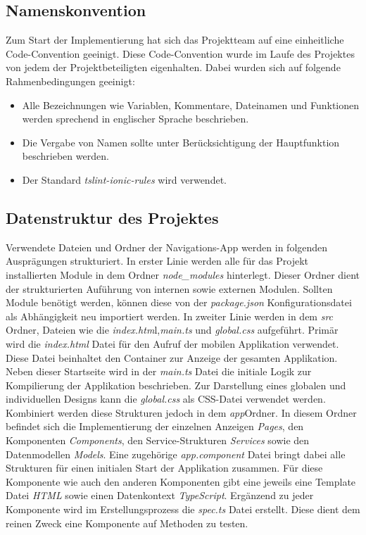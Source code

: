 \subsection{Namenskonvention}
Zum Start der Implementierung hat sich das Projektteam auf eine einheitliche Code-Convention geeinigt. 
Diese Code-Convention wurde im Laufe des Projektes von jedem der Projektbeteiligten eigenhalten. 
Dabei wurden sich auf folgende Rahmenbedingungen geeinigt: 
\begin{itemize}
	\item Alle Bezeichnungen wie Variablen, Kommentare, Dateinamen und Funktionen werden sprechend in englischer Sprache beschrieben.
	\item Die Vergabe von Namen sollte unter Berücksichtigung der Hauptfunktion beschrieben werden.
	\item Der Standard \textit{tslint-ionic-rules} wird verwendet.
\end{itemize}

\subsection{Datenstruktur des Projektes}
Verwendete Dateien und Ordner der Navigations-App werden in folgenden Ausprägungen strukturiert. 
In erster Linie werden alle für das Projekt installierten Module in dem Ordner \textit{node\_modules} hinterlegt. 
Dieser Ordner dient der strukturierten Auführung von internen sowie externen Modulen. 
Sollten Module benötigt werden, können diese von der \textit{package.json} Konfigurationsdatei als Abhängigkeit neu importiert werden. 
In zweiter Linie werden in dem \textit{src} Ordner, Dateien wie die \textit{index.htm}l,\textit{main.ts} und \textit{global.css} aufgeführt. 
Primär wird die \textit{index.html} Datei für den Aufruf der mobilen Applikation verwendet. 
Diese Datei beinhaltet den Container zur Anzeige der gesamten Applikation. 
Neben dieser Startseite wird in der \textit{main.ts} Datei die initiale Logik zur Kompilierung der Applikation beschrieben. 
Zur Darstellung eines globalen und individuellen Designs kann die \textit{global.css} als CSS-Datei verwendet werden. 
Kombiniert werden diese Strukturen jedoch in dem \textit{app}Ordner. 
In diesem Ordner befindet sich die Implementierung der einzelnen Anzeigen \textit{Pages}, den Komponenten \textit{Components}, den Service-Strukturen \textit{Services} sowie den Datenmodellen \textit{Models}. 
Eine zugehörige \textit{app.component} Datei bringt dabei alle Strukturen für einen initialen Start der Applikation zusammen.
Für diese Komponente wie auch den anderen Komponenten gibt eine jeweils eine Template Datei \textit{HTML} sowie einen Datenkontext \textit{TypeScript}. 
Ergänzend zu jeder Komponente wird im Erstellungsprozess die \textit{spec.ts} Datei erstellt. 
Diese dient dem reinen Zweck eine Komponente auf Methoden zu testen.

